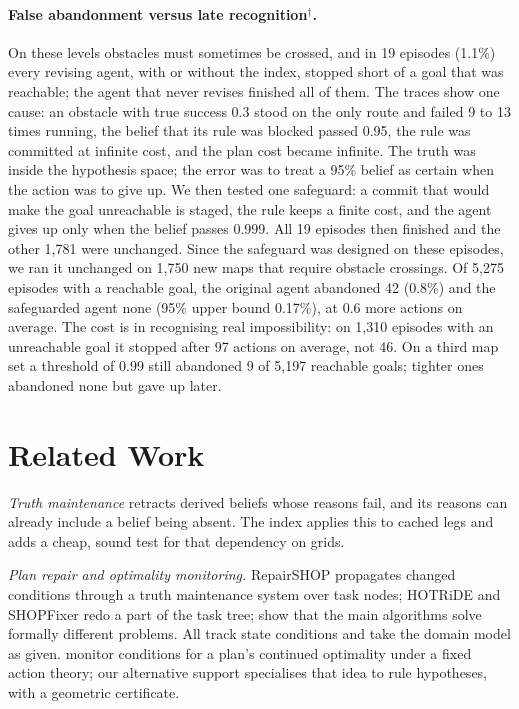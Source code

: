 \documentclass[letterpaper]{article}
\begin{document}
\paragraph{False abandonment versus late recognition$^\dagger$.} On these levels obstacles must sometimes be crossed, and in 19 episodes (1.1\%) every revising agent, with or without the index, stopped short of a goal that was reachable; the agent that never revises finished all of them. The traces show one cause: an obstacle with true success 0.3 stood on the only route and failed 9 to 13 times running, the belief that its rule was blocked passed 0.95, the rule was committed at infinite cost, and the plan cost became infinite. The truth was inside the hypothesis space; the error was to treat a 95\% belief as certain when the action was to give up. We then tested one safeguard: a commit that would make the goal unreachable is staged, the rule keeps a finite cost, and the agent gives up only when the belief passes 0.999. All 19 episodes then finished and the other 1,781 were unchanged. Since the safeguard was designed on these episodes, we ran it unchanged on 1,750 new maps that require obstacle crossings. Of 5,275 episodes with a reachable goal, the original agent abandoned 42 (0.8\%) and the safeguarded agent none (95\% upper bound 0.17\%), at 0.6 more actions on average. The cost is in recognising real impossibility: on 1,310 episodes with an unreachable goal it stopped after 97 actions on average, not 46. On a third map set a threshold of 0.99 still abandoned 9 of 5,197 reachable goals; tighter ones abandoned none but gave up later.

\section{Related Work}

\emph{Truth maintenance} \citep{doyle1979} retracts derived beliefs whose reasons fail, and its reasons can already include a belief being absent. The index applies this to cached legs and adds a cheap, sound test for that dependency on grids.

\emph{Plan repair and optimality monitoring.} RepairSHOP \citep{warfield2007} propagates changed conditions through a truth maintenance system over task nodes; HOTRiDE \citep{ayan2007} and SHOPFixer \citep{goldman2020} redo a part of the task tree; \citet{zaidins2025} show that the main algorithms solve formally different problems. All track state conditions and take the domain model as given. \citet{fritz2007} monitor conditions for a plan's continued optimality under a fixed action theory; our alternative support specialises that idea to rule hypotheses, with a geometric certificate.
\end{document}
